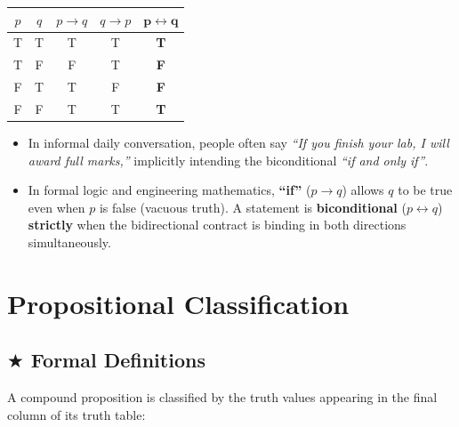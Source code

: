 \documentclass[11pt,a4paper]{article}
\begin{document}
\begin{center}
\renewcommand{\arraystretch}{1.2}
\begin{tabular}{|c|c|c|c|c|}
\hline
\rowcolor{navy!15} $p$ & $q$ & $p \rightarrow q$ & $q \rightarrow p$ & $\mathbf{p \leftrightarrow q}$ \\
\hline
T & T & T & T & \textbf{T} \\
T & F & F & T & \textbf{F} \\
F & T & T & F & \textbf{F} \\
F & F & T & T & \textbf{T} \\
\hline
\end{tabular}
\end{center}

\begin{warningbox}
\begin{itemize}
    \item In informal daily conversation, people often say \textit{``If you finish your lab, I will award full marks,''} implicitly intending the biconditional \textit{``if and only if''}.
    \item In formal logic and engineering mathematics, \textbf{``if''} ($p \to q$) allows $q$ to be true even when $p$ is false (vacuous truth). A statement is \textbf{biconditional} ($p \leftrightarrow q$) \textbf{strictly} when the bidirectional contract is binding in both directions simultaneously.
\end{itemize}
\end{warningbox}

\newpage

\section{Propositional Classification}

\subsection{\texorpdfstring{$\bigstar$ }{*}Formal Definitions}
A compound proposition is classified by the truth values appearing in the final column of its truth table:
\end{document}
